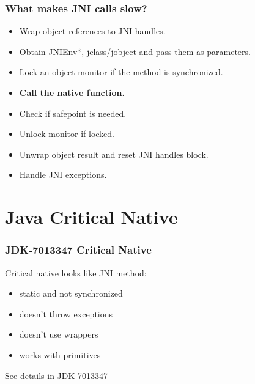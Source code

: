 \documentclass{beamer}
\begin{document}
  	\begin{frame}
  		\frametitle{What makes JNI calls slow?}
  		\begin{itemize}
  			\item {\color{gray} Wrap object references to JNI handles.}
  			\item {\color{gray} Obtain JNIEnv*, jclass/jobject and pass them as parameters.}
  			\item {\color{gray} Lock an object monitor if the method is synchronized.}
  			\item \textbf{Call the native function.}
  			\item {\color{gray} Check if safepoint is needed.}
  			\item {\color{gray} Unlock monitor if locked.}
  			\item {\color{gray} Unwrap object result and reset JNI handles block.}
  			\item {\color{gray} Handle JNI exceptions.}
  		\end{itemize}
  	\end{frame}
  	\section{Java Critical Native}	
  	\begin{frame}
  		\frametitle{JDK-7013347 Critical Native}
  		Critical native looks like JNI method:
  		\begin{itemize}
  			\item static and not synchronized
  			\item doesn't throw exceptions
  			\item doesn't use wrappers
  			\item works with primitives
  		\end{itemize}
  		\vskip15pt
  		See details in JDK-7013347
  	\end{frame}
\end{document}
